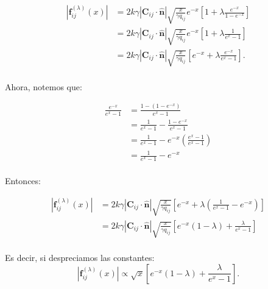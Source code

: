 \documentclass[11pt,a4paper]{article}
\begin{document}
\begin{equation}
	\begin{split}
		\left|\mathbf{ f}_{ij}^{(\lambda)}(x)\right|
		&= 2k\gamma
		\left|\mathbf C_{ij}\cdot\hat{\mathbf n}\right|
		\sqrt{\frac{x}{\gamma q_{ij}}} e^{-x}
		\left[
		1
		+
		\lambda
		\frac{e^{-x}}
		{1-e^{-x}}
		\right] \\
		&= 2k\gamma
		\left|\mathbf C_{ij}\cdot\hat{\mathbf n}\right|
		\sqrt{\frac{x}{\gamma q_{ij}}} e^{-x}
		\left[
		1
		+
		\lambda
		\frac{1}
		{e^{x}-1}
		\right]\\
		&= 2k\gamma
		\left|\mathbf C_{ij}\cdot\hat{\mathbf n}\right|
		\sqrt{\frac{x}{\gamma q_{ij}}} 
		\left[
		e^{-x}
		+
		\lambda
		\frac{e^{-x}}
		{e^{x}-1}
		\right].\\
	\end{split}
\end{equation}

Ahora, notemos que:

\begin{equation}
	\begin{split}
		\frac{e^{-x}}
		{e^{x}-1}
		&= \frac{1-(1-e^{-x})}
		{e^{x}-1} \\
		&= \frac{1}
		{e^{x}-1}-\frac{1-e^{-x}}
		{e^{x}-1}\\
		&= \frac{1}
		{e^{x}-1}-e^{-x}\left(\frac{e^{x}-1}
		{e^{x}-1}\right)\\
		&= \frac{1}
		{e^{x}-1}-e^{-x}\\
	\end{split}
\end{equation}

Entonces:

\begin{equation}
	\begin{split}
		\left|\mathbf{ f}_{ij}^{(\lambda)}(x)\right|
		&= 2k\gamma
		\left|\mathbf C_{ij}\cdot\hat{\mathbf n}\right|
		\sqrt{\frac{x}{\gamma q_{ij}}} 
		\left[
		e^{-x}
		+
		\lambda
		\left(\frac{1}
		{e^{x}-1}-e^{-x}\right)
		\right] \\
		&= 2k\gamma
		\left|\mathbf C_{ij}\cdot\hat{\mathbf n}\right|
		\sqrt{\frac{x}{\gamma q_{ij}}} 
		\left[
		e^{-x}(1-\lambda)
		+
		\frac{\lambda}
		{e^{x}-1}
		\right]\\
	\end{split}
\end{equation}

Es decir, si despreciamos las constantes:
\begin{equation}
	\left|\mathbf{ f}_{ij}^{(\lambda)}(x)\right|
	\propto 
	\sqrt{x} 
	\left[
	e^{-x}(1-\lambda)
	+
	\frac{\lambda}
	{e^{x}-1}
	\right].
\end{equation}
\end{document}
